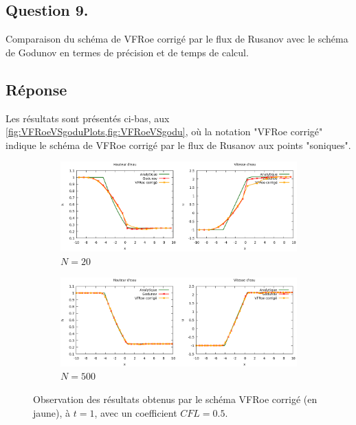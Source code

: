\documentclass[
	french,
	11pt, %
]{fphw}
\begin{document}
\subsection*{Question 9.}
\begin{problem}
Comparaison du schéma de VFRoe corrigé par le flux de Rusanov avec le schéma de Godunov en termes de précision et de temps de calcul.
\end{problem}

\subsection*{Réponse} 

Les résultats sont présentés ci-bas, aux \cref{fig:VFRoeVSgoduPlots,fig:VFRoeVSgodu}, où la notation "VFRoe corrigé" indique le schéma de VFRoe corrigé par le flux de Rusanov aux points "soniques".

\begin{figure}[H]
	\centering
	\begin{subfigure}[b]{0.8\textwidth}
		\centering
		\includegraphics[width=\textwidth]{VFRoeVSGodu1.png}
		\caption{$N=20$}
		\label{fig:VFRoeVSgoduPlotsA}
	\end{subfigure}
	\begin{subfigure}[b]{0.8\textwidth}
		\centering
		\includegraphics[width=\textwidth]{VFRoeVSGodu2.png}
		\caption{$N=500$}
	\end{subfigure}
	\caption{Observation des résultats obtenus par le schéma VFRoe corrigé (en jaune), à $t=1$, avec un coefficient $CFL=0.5$.}
	\label{fig:VFRoeVSgoduPlots}
\end{figure}
\end{document}

